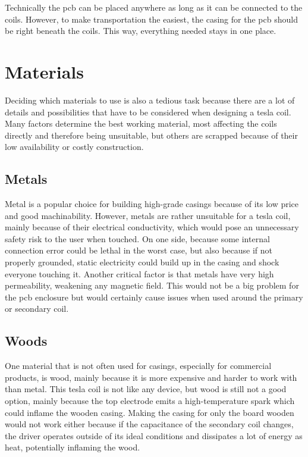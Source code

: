 Technically the \gls{pcb} can be placed anywhere as long as it can be connected to the coils. However, to make transportation the easiest, the casing for the \gls{pcb} should be right beneath the coils. This way, everything needed stays in one place. 

\section{Materials}

Deciding which materials to use is also a tedious task because there are a lot of details and possibilities that have to be considered when designing a tesla coil. Many factors determine the best working material, most affecting the coils directly and therefore being unsuitable, but others are scrapped because of their low availability or costly construction.

\subsection{Metals}
\label{subsec:materials-metals}

Metal is a popular choice for building high-grade casings because of its low price and good machinability. However, metals are rather unsuitable for a tesla coil, mainly because of their electrical conductivity, which would pose an unnecessary safety risk to the user when touched. On one side, because some internal connection error could be lethal in the worst case, but also because if not properly grounded, static electricity could build up in the casing and shock everyone touching it. Another critical factor is that metals have very high permeability, weakening any magnetic field. This would not be a big problem for the \gls{pcb} enclosure but would certainly cause issues when used around the primary or secondary coil.

\subsection{Woods}

One material that is not often used for casings, especially for commercial products, is wood, mainly because it is more expensive and harder to work with than metal. This tesla coil is not like any device, but wood is still not a good option, mainly because the top electrode emits a high-temperature spark which could inflame the wooden casing. Making the casing for only the board wooden would not work either because if the capacitance of the secondary coil changes, the driver operates outside of its ideal conditions and dissipates a lot of energy as heat, potentially inflaming the wood.

